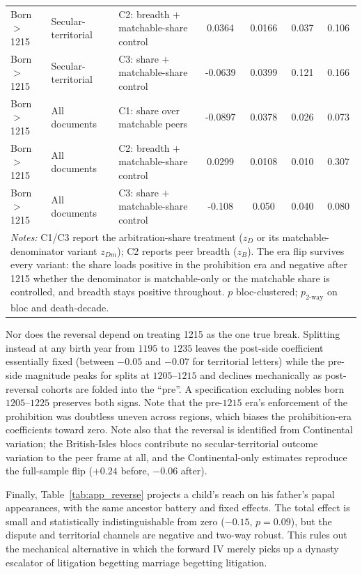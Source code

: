 \documentclass[12pt]{article}
\theoremstyle{definition}
\theoremstyle{remark}
\begin{document}
\begin{table}[t]
{\begin{tabular}{lllcccc}
Born $>$1215 & Secular-territorial & C2: breadth $+$ matchable-share control & 0.0364 & 0.0166 & 0.037 & 0.106 \\
Born $>$1215 & Secular-territorial & C3: share $+$ matchable-share control & -0.0639 & 0.0399 & 0.121 & 0.166 \\
Born $>$1215 & All documents & C1: share over matchable peers & -0.0897 & 0.0378 & 0.026 & 0.073 \\
Born $>$1215 & All documents & C2: breadth $+$ matchable-share control & 0.0299 & 0.0108 & 0.010 & 0.307 \\
Born $>$1215 & All documents & C3: share $+$ matchable-share control & -0.108 & 0.050 & 0.040 & 0.080 \\
\midrule
\multicolumn{7}{p{0.9\textwidth}}{\footnotesize \textit{Notes:} C1/C3 report the arbitration-share treatment ($z_D$ or its matchable-denominator variant $z_{Dm}$); C2 reports peer breadth ($z_B$). The era flip survives every variant: the share loads positive in the prohibition era and negative after 1215 whether the denominator is matchable-only or the matchable share is controlled, and breadth stays positive throughout. $p$ bloc-clustered; $p_{\text{2-way}}$ on bloc and death-decade.} \\
\bottomrule
\end{tabular}
}
\end{table}



Nor does the reversal depend on treating 1215 as the one true break. Splitting instead at any birth year from $1195$ to $1235$ leaves the post-side coefficient essentially fixed (between $-0.05$ and $-0.07$ for territorial letters) while the pre-side magnitude peaks for splits at $1205$--$1215$ and declines mechanically as post-reversal cohorts are folded into the ``pre''. A specification excluding nobles born $1205$--$1225$ preserves both signs. Note that the pre-$1215$ era's enforcement of the prohibition was doubtless uneven across regions, which biases the prohibition-era coefficients toward zero. Note also that the reversal is identified from Continental variation; the British-Isles blocs contribute no secular-territorial outcome variation to the peer frame at all, and the Continental-only estimates reproduce the full-sample flip ($+0.24$ before, $-0.06$ after).

Finally, Table~\ref{tab:app_reverse} projects a child's reach on his father's papal appearances, with the same ancestor battery and fixed effects. The total effect is small and statistically indistinguishable from zero ($-0.15$, $p=0.09$), but the dispute and territorial channels are negative and two-way robust. This rules out the mechanical alternative in which the forward IV merely picks up a dynasty escalator of litigation begetting marriage begetting litigation.
\end{document}
